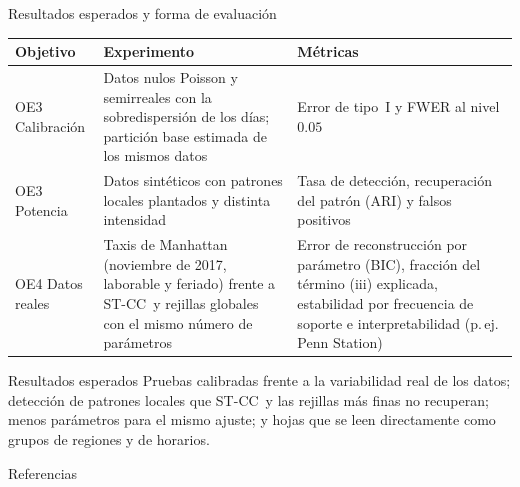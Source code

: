 \documentclass[aspectratio=169,10pt,t]{beamer}
\newcommand{\STCC}{ST-CC}
\begin{document}
\begin{frame}{Resultados esperados y forma de evaluación}
  \footnotesize
  \begin{tabular}{@{}>{\raggedright\arraybackslash}p{2.4cm}>{\raggedright\arraybackslash}p{5.6cm}>{\raggedright\arraybackslash}p{5.2cm}@{}}
    \toprule
    \textbf{Objetivo} & \textbf{Experimento} & \textbf{Métricas} \\
    \midrule
    OE3 \newline Calibración & Datos nulos Poisson y semirreales con la sobredispersión de los días; partición base estimada de los mismos datos
      & Error de tipo~I y FWER al nivel $0.05$ \\
    OE3 \newline Potencia & Datos sintéticos con patrones locales plantados y distinta intensidad
      & Tasa de detección, recuperación del patrón (ARI) y falsos positivos \\
    OE4 \newline Datos reales & Taxis de Manhattan (noviembre de 2017, laborable y feriado) frente a \STCC\ y rejillas globales con el mismo número de parámetros
      & Error de reconstrucción por parámetro (BIC), fracción del término (iii) explicada, estabilidad por frecuencia de soporte e interpretabilidad (p.\,ej. Penn Station) \\
    \bottomrule
  \end{tabular}
  \vspace{1.2ex}
  \begin{alertblock}{Resultados esperados}
    \small
    Pruebas calibradas frente a la variabilidad real de los datos; detección de patrones locales que
    \STCC\ y las rejillas más finas no recuperan; menos parámetros para el mismo ajuste; y hojas que se
    leen directamente como grupos de regiones y de horarios.
  \end{alertblock}
\end{frame}

\begin{frame}[plain]
\end{frame}

\begin{frame}[allowframebreaks]{Referencias}
  \scriptsize
  
  
\end{frame}
\end{document}
